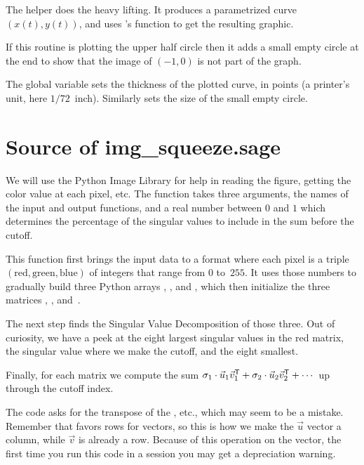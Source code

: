 The helper does the heavy lifting.
It produces a parametrized curve $(x(t),y(t))$, and uses \Sage's
 function to get the resulting graphic.

If this routine is plotting the upper half circle then it adds a
small empty circle at the end to show that the image of $(-1,0)$
is not part of the graph.

The global variable  sets the thickness of 
the plotted curve, in points (a printer's unit, here $1/72$~inch).
Similarly  sets the size of the small empty circle.



\section{Source of img\_squeeze.sage}
We will use the Python Image Library for help in reading the figure, 
getting the color value at each pixel, etc.
The function
takes three arguments, the names of the input and output functions, and
a real number between $0$ and $1$ which determines the percentage 
of the singular values to include in the sum before the cutoff.


This function first brings the input data to a format where each
pixel is a triple 
$(\text{red}, \text{green},\text{blue})$ of integers that range from 
$0$ to~$255$.
It uses those numbers to gradually build 
three Python arrays , ,
and , which then initialize the 
three \Sage{} matrices ,
, and~.


The next step finds the Singular Value Decomposition of those three.
Out of curiosity, we have a peek at the eight largest singular
values in the red matrix, the singular value where we make the cutoff,
and the eight smallest.


Finally, for each matrix we compute the sum
$\sigma_1\cdot\vec{u}_1{{\vec{v}}^{\textsf{T}}}_1+\sigma_2\cdot\vec{u}_2{{\vec{v}}^{\textsf{T}}}_2
   +\cdots$
up through the cutoff index.

The code asks for the transpose of the
\protect{}, etc., which may seem to be a mistake.
Remember that \protect\Sage{} favors rows for vectors, so this is how we
make the $\vec{u}$ vector a column, while $\vec{v}$ is already a row.
Because of this operation on the vector, the first time you run this
code in a \protect\Sage{} session you may get a depreciation warning.

